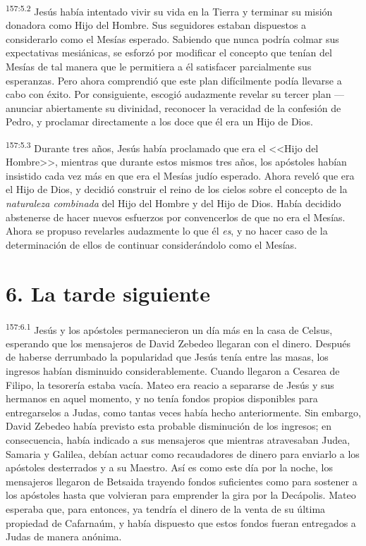\par 
\textsuperscript{157:5.2} Jesús había intentado vivir su vida en la Tierra y terminar su misión donadora como Hijo del Hombre. Sus seguidores estaban dispuestos a considerarlo como el Mesías esperado. Sabiendo que nunca podría colmar sus expectativas mesiánicas, se esforzó por modificar el concepto que tenían del Mesías de tal manera que le permitiera a él satisfacer parcialmente sus esperanzas. Pero ahora comprendió que este plan difícilmente podía llevarse a cabo con éxito. Por consiguiente, escogió audazmente revelar su tercer plan ---anunciar abiertamente su divinidad, reconocer la veracidad de la confesión de Pedro, y proclamar directamente a los doce que él era un Hijo de Dios.

\par 
\textsuperscript{157:5.3} Durante tres años, Jesús había proclamado que era el <<Hijo del Hombre>>, mientras que durante estos mismos tres años, los apóstoles habían insistido cada vez más en que era el Mesías judío esperado. Ahora reveló que era el Hijo de Dios, y decidió construir el reino de los cielos sobre el concepto de la \textit{naturaleza combinada} del Hijo del Hombre y del Hijo de Dios. Había decidido abstenerse de hacer nuevos esfuerzos por convencerlos de que no era el Mesías. Ahora se propuso revelarles audazmente lo que él \textit{es}, y no hacer caso de la determinación de ellos de continuar considerándolo como el Mesías.

\section*{6. La tarde siguiente}
\par 
\textsuperscript{157:6.1} Jesús y los apóstoles permanecieron un día más en la casa de Celsus, esperando que los mensajeros de David Zebedeo llegaran con el dinero. Después de haberse derrumbado la popularidad que Jesús tenía entre las masas, los ingresos habían disminuido considerablemente. Cuando llegaron a Cesarea de Filipo, la tesorería estaba vacía. Mateo era reacio a separarse de Jesús y sus hermanos en aquel momento, y no tenía fondos propios disponibles para entregarselos a Judas, como tantas veces había hecho anteriormente. Sin embargo, David Zebedeo había previsto esta probable disminución de los ingresos; en consecuencia, había indicado a sus mensajeros que mientras atravesaban Judea, Samaria y Galilea, debían actuar como recaudadores de dinero para enviarlo a los apóstoles desterrados y a su Maestro. Así es como este día por la noche, los mensajeros llegaron de Betsaida trayendo fondos suficientes como para sostener a los apóstoles hasta que volvieran para emprender la gira por la Decápolis. Mateo esperaba que, para entonces, ya tendría el dinero de la venta de su última propiedad de Cafarnaúm, y había dispuesto que estos fondos fueran entregados a Judas de manera anónima.

